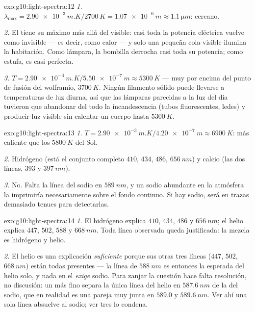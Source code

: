 \begin{solution}{exo:g10:light-spectra:12}
\emph{1.} $\lambda_{\max} = \qty{2.90e-3}{m.K} / \qty{2700}{K}
= \qty{1.07e-6}{m} \approx \qty{1.1}{\micro m}$:  cercano.

\emph{2.} El  tiene su máximo más allá del visible: casi toda la
potencia eléctrica vuelve como  invisible --- es decir, como
calor --- y solo una pequeña cola visible ilumina la habitación. Como
lámpara, la bombilla derrocha casi toda su potencia; como estufa, es
casi perfecta.

\emph{3.} $T = \qty{2.90e-3}{m.K} / \qty{5.50e-7}{m} \approx
\qty{5300}{K}$ --- muy por encima del punto de fusión del wolframio,
$\qty{3700}{K}$. Ningún filamento sólido puede llevarse a temperaturas
de luz diurna, así que las lámparas parecidas a la luz del día tuvieron
que abandonar del todo la incandescencia (tubos fluorescentes, ledes) y
producir luz visible sin calentar un cuerpo hasta $\qty{5300}{K}$.
\end{solution}

\begin{solution}{exo:g10:light-spectra:13}
\emph{1.} $T = \qty{2.90e-3}{m.K} / \qty{4.20e-7}{m} \approx
\qty{6900}{K}$: más caliente que los $\qty{5800}{K}$ del Sol.

\emph{2.} Hidrógeno (está el conjunto completo $410$, $434$, $486$,
$\qty{656}{nm}$) y calcio (las dos líneas, $393$ y $\qty{397}{nm}$).

\emph{3.} No. Falta la línea del sodio en $\qty{589}{nm}$, y un sodio
abundante en la atmósfera la imprimiría necesariamente sobre el fondo
continuo. Si hay sodio, será en trazas demasiado tenues para
detectarlas.
\end{solution}

\begin{solution}{exo:g10:light-spectra:14}
\emph{1.} El hidrógeno explica $410$, $434$, $486$ y $\qty{656}{nm}$; el
helio explica $447$, $502$, $588$ y $\qty{668}{nm}$. Toda línea
observada queda justificada: la mezcla es hidrógeno y helio.

\emph{2.} El helio es una explicación \emph{suficiente} porque sus otras
tres líneas ($447$, $502$, $\qty{668}{nm}$) están todas presentes --- la
línea de $\qty{588}{nm}$ es entonces la esperada del helio solo, y nada
en el  \emph{exige} sodio. Para zanjar la cuestión hace falta
resolución, no discusión: un  más fino separa la única
línea del helio en $\qty{587.6}{nm}$ de la del sodio, que en realidad es
una pareja muy junta en $589.0$ y $\qty{589.6}{nm}$. Ver ahí una sola
línea absuelve al sodio; ver tres lo condena.
\end{solution}

